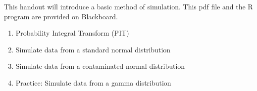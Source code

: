 This handout will introduce a basic method of simulation. This pdf file and the R program are provided on Blackboard.
\begin{enumerate}
	\item Probability Integral Transform (PIT)
	\item Simulate data from a standard normal distribution
	\item Simulate data from a contaminated normal distribution
	\item Practice: Simulate data from a gamma distribution 
\end{enumerate}